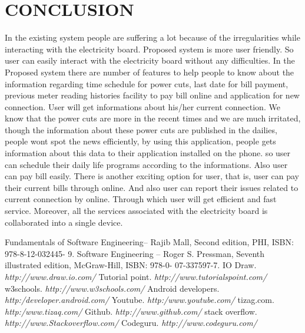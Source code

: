 \documentclass[12pt,a4paper,oneside]{report}
\begin{document}
\chapter{CONCLUSION}
In the existing system people are suffering a lot because of the irregularities while interacting
with the electricity board. Proposed system is more user friendly. So user can easily
interact with the electricity board without any difficulties. In the Proposed system there are
number of features to help people to know about the information regarding time schedule for
power cuts, last date for bill payment, previous meter reading histories facility to pay bill
online and application for new connection. User will get informations about his/her current connection.
We know that the power cuts are more in the recent times and we are much irritated,
though the information about these power cuts are published in the dailies, people wont spot
the news efficiently, by using this application, people gets information about this data to their
application installed on the phone. so user can schedule their daily life programs according to
the informations. Also user can pay bill easily. There is another exciting option for user, that is,
user can pay their current bills through online. And also user can report their issues related to
current connection by online. Through which user will get efficient and fast service. Moreover,
all the services associated with the electricity board is collaborated into a single device.\\  
 


\newpage
\renewcommand{\bibname}{REFERENCES}
\begin{thebibliography}{999}
	Fundamentals of Software Engineering– Rajib Mall, Second edition, PHI, ISBN: 978-8-12-032445-
	9.
	Software Engineering – Roger S. Pressman, Seventh illustrated edition, McGraw-Hill, ISBN: 978-0-
	07-337597-7.
  IO Draw. \textit{http://www.draw.io.com/}
 Tutorial point. \textit{http://www.tutorialspoint.com/}
  w3schools.
  \textit{http://www.w3schools.com/}
   Android developers.
    \textit{http:/developer.android.com/}
    Youtube.
        \textit{http:/www.youtube.com/}
    tizag.com.
        \textit{http:/www.tizaq.com/}
        Github. \textit{http://www.github.com/}
        stack overflow. \textit{http://www.Stackoverflow.com/}
         Codeguru. \textit{http://www.codeguru.com/}
     
\end{thebibliography}
\end{document}
